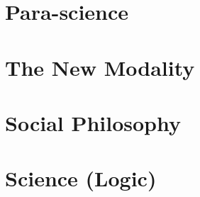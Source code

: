 \documentclass[10pt,twoside]{memoir}
\begin{document}
\part{Para-science}





\part{The New Modality}









\part{Social Philosophy}





\part{Science (Logic)}



% 
\end{document}
